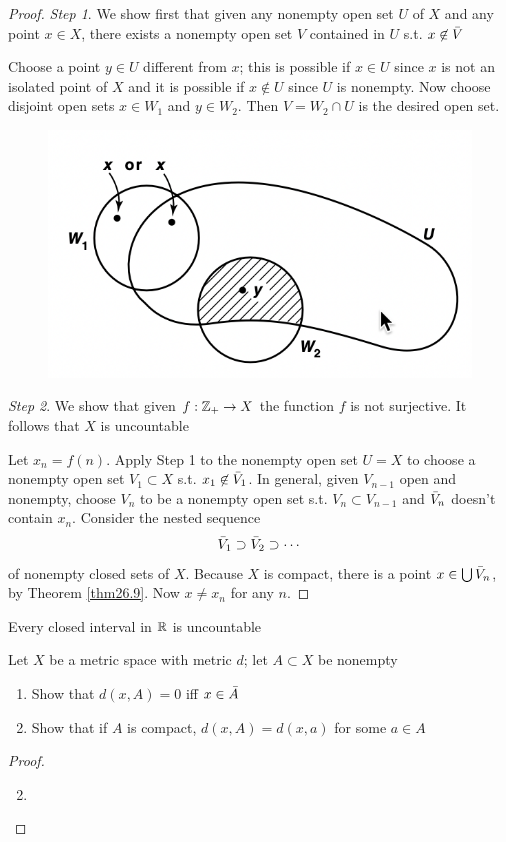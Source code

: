 \documentclass[11pt]{article}
\begin{document}
\begin{proof}
\emph{Step 1}. We show first that given any nonempty open set \(U\) of \(X\) and any point \(x\in X\),
there exists a nonempty open set \(V\) contained in \(U\) s.t. \(x\not\in\bar{V}\)

Choose a point \(y\in U\) different from \(x\); this is possible if \(x\in U\) since \(x\) is not an
isolated point of \(X\) and it is possible if \(x\not\in U\) since \(U\) is nonempty. Now choose
disjoint open sets \(x\in W_1\) and \(y\in W_2\). Then \(V=W_2\cap U\) is the desired open set.

\begin{figure}[htbp]
\centering
\includegraphics[width=.7\textwidth]{../images/Topology/8.png}
\label{}
\end{figure}

\emph{Step 2}. We show that given \(f:\mathbb{Z}_+\to X\) the function \(f\) is not surjective. It follows
that \(X\) is uncountable

Let \(x_n=f(n)\). Apply Step 1 to the nonempty open set \(U=X\) to choose a nonempty open
set \(V_1\subset X\) s.t. \(x_1\not\in\bar{V}_1\). In general, given \(V_{n-1}\) open and nonempty,
choose \(V_n\) to be a nonempty open set s.t. \(V_n\subset V_{n-1}\) and \(\bar{V}_n\) doesn't
contain \(x_n\). Consider the nested sequence
\begin{equation*}
\bar{V}_1\supset \bar{V}_2\supset\cdots
\end{equation*}
of nonempty closed sets of \(X\). Because \(X\) is compact, there is a point \(x\in\bigcup\bar{V}_n\), by
Theorem \ref{thm26.9}. Now \(x\neq x_n\) for any \(n\).
\end{proof}

\begin{corollary}[]
Every closed interval in \(\mathbb{R}\) is uncountable
\end{corollary}

\begin{exercise}
\label{ex27.2}
Let \(X\) be a metric space with metric \(d\); let \(A\subset X\) be nonempty
\begin{enumerate}
\item Show that \(d(x,A)=0\) iff \(x\in\bar{A}\)
\item Show that if \(A\) is compact, \(d(x,A)=d(x,a)\) for some \(a\in A\)
\end{enumerate}
\end{exercise}

\begin{proof}
\begin{enumerate}
\setcounter{enumi}{1}
\item 
\end{enumerate}
\end{proof}
\end{document}
